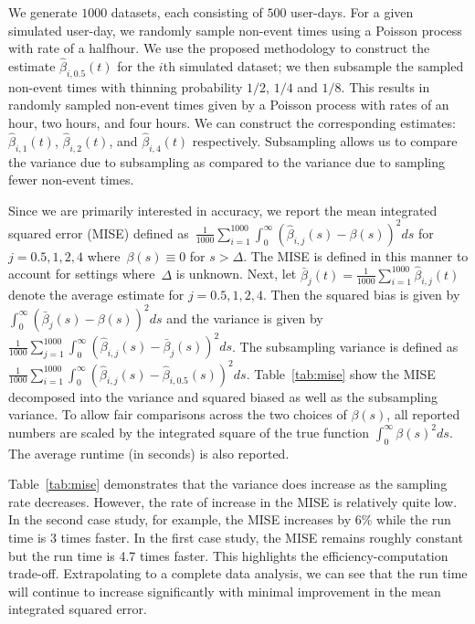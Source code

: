 \documentclass[12pt]{amsart}
\begin{document}
We generate $1000$ datasets, each consisting of $500$ user-days.  For a given simulated user-day, we randomly sample non-event times using a Poisson process with rate of a halfhour.  We use the proposed methodology to construct the estimate $\hat \beta_{i,0.5} (t)$ for the $i$th simulated dataset; we then subsample the sampled non-event times with thinning probability $1/2$, $1/4$ and $1/8$.  This results in randomly sampled non-event times given by a Poisson process with rates of an hour, two hours, and four hours.  We can construct the corresponding estimates: $\hat \beta_{i,1} (t)$, $\hat \beta_{i,2} (t)$, and $\hat \beta_{i,4} (t)$ respectively. Subsampling allows us to compare the variance due to subsampling as compared to the variance due to sampling fewer non-event times.

Since we are primarily interested in accuracy, we report the mean integrated squared error (MISE) defined as~$\frac{1}{1000} \sum_{i=1}^{1000} \int_{0}^{\infty} ( \hat \beta_{i,j} (s) - \beta(s))^2 ds$ for $j=0.5,1,2,4$ where~$\beta(s) \equiv 0$ for $s > \Delta$.  The MISE is defined in this manner to account for settings where~$\Delta$ is unknown.  Next, let $\bar \beta_{j} (t) = \frac{1}{1000} \sum_{i=1}^{1000} \hat \beta_{i,j} (t)$ denote the average estimate for $j=0.5,1,2,4$.  Then the squared bias is given by $\int_{0}^{\infty} ( \bar \beta_{j} (s) - \beta (s))^2 ds$ and the variance is given by $\frac{1}{1000} \sum_{j=1}^{1000} \int_{0}^{\infty} ( \hat \beta_{i,j} (s) - \bar \beta_j(s))^2 ds$.  The subsampling variance is defined as $\frac{1}{1000} \sum_{i=1}^{1000} \int_{0}^{\infty} ( \hat \beta_{i,j} (s) - \hat \beta_{i,0.5} (s))^2 ds$.  Table~\ref{tab:mise} show the MISE decomposed into the variance and squared biased as well as the subsampling variance.  To allow fair comparisons across the two choices of $\beta(s)$, all reported numbers are scaled by the integrated square of the true function $\int_{0}^{\infty} \beta(s)^2 ds$. The average runtime (in seconds) is also reported.

Table~\ref{tab:mise} demonstrates that the variance does increase as the sampling rate decreases.  However, the rate of increase in the MISE is relatively quite low.  In the second case study, for example, the MISE increases by 6\% while the run time is 3 times faster.  In the first case study, the MISE remains roughly constant but the run time is 4.7 times faster.  This highlights the efficiency-computation trade-off.  Extrapolating to a complete data analysis, we can see that the run time will continue to increase significantly with minimal improvement in the mean integrated squared error.
\end{document}
